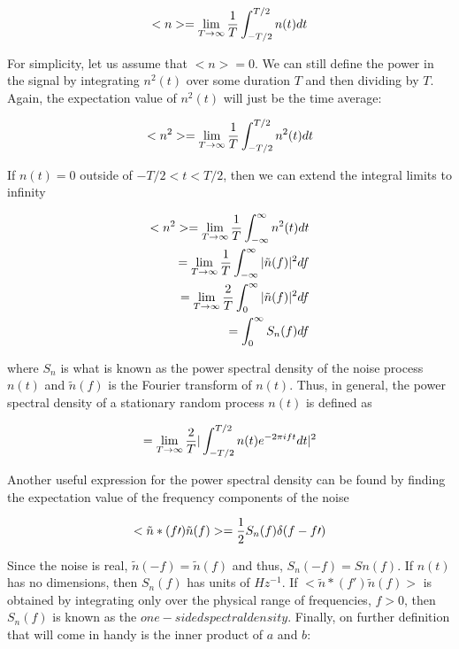 \documentclass[binding=0.6cm, LaM]{sapthesis}
\begin{document}
		\begin{equation}
		<n> = \lim_{T \to \infty} {1 \over T} \int^{T/2}_{-T/2}n(t)dt
		\end{equation}

	For simplicity, let us assume that $<n> = 0$. We can still define the power in the signal by 
	integrating $n^2(t)$ over some duration $T$ and then dividing by $T$. 
	Again, the expectation value of $n^2(t)$ will just be the time average:

		\begin{equation}
		<n^2> = \lim_{T \to \infty} {1 \over T} \int^{T/2}_{-T/2}n^2(t)dt
		\end{equation}

	If $n(t) = 0$ outside of $−T/2 < t < T/2$, then we can extend the integral limits to infinity
	
		\begin{equation}
		\begin{split}
  		<n^2>  = \lim_{T \to \infty}{1 \over T}\int^{\infty}_{-\infty}n^2(t) dt \\
         	       = \lim_{T \to \infty}{1 \over T} \int^{\infty}_{-\infty}|\tilde{n}(f)|^2df \\ 
                       = \lim_{T \to \infty}{2 \over T} \int^{\infty}_{0}|\tilde{n}(f)|^2df \\
                       = \int^{\infty}_{0}S_n(f)df
		\end{split}
		\end{equation}

	where $S_n$ is what is known as the power spectral density of the noise process $n(t)$ 
	and $\tilde{n}(f)$ is the Fourier transform of $n(t)$. 
	Thus, in general, the power spectral density of a stationary random process $n(t)$ is defined as

		\begin{equation}
		= \lim_{T \to \infty}{2 \over T} |\int^{T/2}_{-T/2}n(t)e^{-2\pi ift}dt|^2
		\end{equation}

	Another useful expression for the power spectral density can be found by finding 
	the expectation value of the frequency components of the noise

		\begin{equation}
		<\tilde{n}\ast(f\prime)\tilde{n}(f)>  = {1 \over 2} S_n(f) \delta (f-f\prime)
		\end{equation}

	Since the noise is real, $\tilde{n}(-f) = \tilde{n}(f)$ and thus, $S_n(−f) = Sn(f)$. 
	If $n(t)$ has no dimensions, then $S_n(f)$ has units of $Hz^{-1}$.
 	If $<\tilde{n}\ast(f\prime)\tilde{n}(f)> $ is obtained by integrating only over the physical
	range of frequencies, $f > 0$, then $S_n(f)$ is known as the $one-sided spectral density$.
	Finally, on further definition that will come in handy is the inner product of $a$ and $b$:
\end{document}
